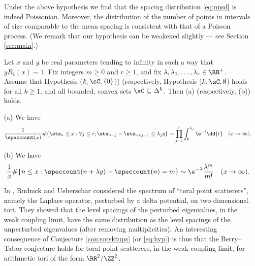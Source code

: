 \documentclass[12pt, reqno, twoside, letterpaper]{amsart}
\begin{document}
Under the above hypothesis we find that the spacing distribution 
\eqref{eq:nnsd} is indeed Poissonian.
%
Moreover, the distribution of the number of points in intervals of 
size comparable to the mean spacing is consistent with that of a 
Poisson process.
%
(We remark that our hypothesis can be weakened slightly --- see 
Section \ref{sec:main}.)

\begin{theorem}
 \label{thm:main}
%
Let $x$ and $y$ be real parameters tending to infinity in such a 
way that $yR_1(x) \sim 1$.
%
Fix integers $m \ge 0$ and $r \ge 1$, and fix 
$\lambda,\lambda_1,\ldots,\lambda_r \in \RR^{+}$.
%
Assume that Hypothesis
\textup{(}$k,\sC,\{0\}$\textup{)}\textup{)}
\textup{(}respectively, 
Hypothesis
\textup{(}$k,\sC,\emptyset$\textup{)}
holds 
for all $k \ge 1$, and all bounded, convex sets 
$\sC \subseteq \Delta^k$.
%
Then \textup{(}a\textup{)} \textup{(}respectively, 
\textup{(}b\textup{)}\textup{)} holds.


\textup{(}a\textup{)} We have  
%
\begin{equation}
 \label{eq:thm:mainc}
  \frac{1}{\speccount(x)}
   \#\{\sts_n \le x : \forall j \le r, \sts_{n + j} - \sts_{n + j - 1} \le \lambda_j y\}
    \sim 
     \prod_{j = 1}^r 
      \int_0^{\lambda_j} \e^{-t} \dd{t} %
       \quad 
     (x \to \infty).
\end{equation}

\textup{(}b\textup{)} We have 
%
\begin{equation}
 \label{eq:thm:main}
  \frac{1}{x}
   \#\{n \le x : \speccount(n + \lambda y) - \speccount(n) = m\}
    \sim 
     \e^{-\lambda}\frac{\lambda^m}{m!}
       \quad     
     (x \to \infty).
\end{equation}


\end{theorem}
In \cite{RU:14}, Rudnick and Uebersch\"ar considered the spectrum 
of ``toral point scatterers'', namely the Laplace operator, 
perturbed by a delta potential, on two dimensional tori.  
%
They showed that the level spacings of the perturbed eigenvalues, 
in the weak coupling limit, have the same distribution as the 
level spacings of the unperturbed eigenvalues (after removing 
multiplicities).
%
An interesting consequence of Conjecture \ref{con:sotsktups} (or 
\eqref{eq:hyp}) is thus that the Berry--Tabor conjecture holds for 
toral point scatterers, in the weak coupling limit, for arithmetic 
tori of the form $\RR^2/\ZZ^2$.
\end{document}
